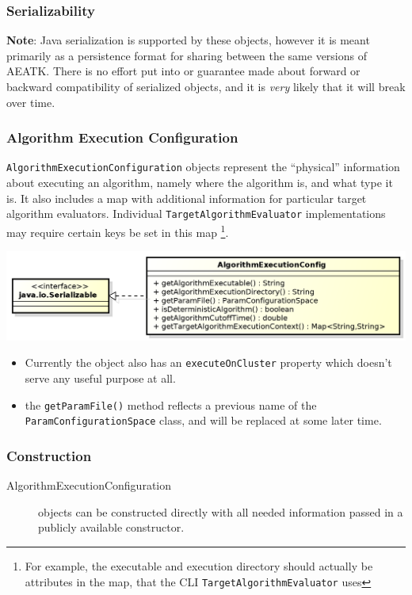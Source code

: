 \documentclass[11pt,letterpaper,oneside]{article}
\begin{document}
\subsubsection{Serializability}

\textbf{Note}: Java serialization is supported by these objects, however it is meant primarily as a persistence format for sharing between the same versions of AEATK. There is no effort put into or guarantee made about forward or backward compatibility of serialized objects, and it is \emph{very} likely that it will break over time.


\subsubsection{Algorithm Execution Configuration}

\texttt{AlgorithmExecutionConfiguration} objects represent the ``physical'' information about executing an algorithm, namely where the algorithm is, and what type it is. It also includes a map with additional information for particular target algorithm evaluators. Individual \texttt{TargetAlgorithmEvaluator} implementations may require certain keys be set in this map \footnote{For example, the executable and execution directory should actually be attributes in the map, that the CLI \texttt{TargetAlgorithmEvaluator} uses}. 

\begin{center}
\includegraphics[scale=0.75]{img/UML/ExecConfig.png}
\end{center}

\begin{itemize}
\item Currently the object also has an \texttt{executeOnCluster} property which doesn't serve any useful purpose at all.
\item the \texttt{getParamFile()} method reflects a previous name of the \texttt{ParamConfigurationSpace} class, and will be replaced at some later time.
\end{itemize}

\subsubsection{Construction}
\begin{description}
\item[AlgorithmExecutionConfiguration] objects can be constructed directly with all needed information passed in a publicly available constructor.
\end{description}
\end{document}
